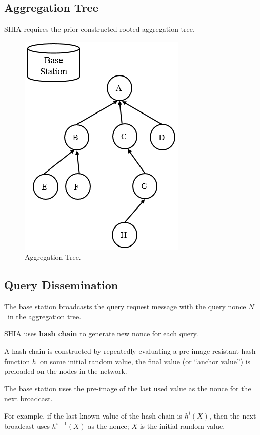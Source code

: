 \documentclass[%
  slidesonly,%
  semlayer%
  ]{seminar}                                  %
\begin{document}
\begin{slide}
    \subsection*{Aggregation Tree}
      SHIA requires the prior constructed rooted aggregation tree.
      \begin{figure}[h!]
        \centering
        \includegraphics[scale=0.4]{images/aggregation-tree-1.png}
        \caption{Aggregation Tree.}
        \label{fig:Aggregation-tree-1}
      \end{figure}
      \clearpage

    \subsection*{Query Dissemination}
      The base station broadcasts the query request message with the query nonce $N$\ in the aggregation tree. 
    
      SHIA uses \textbf{hash chain} to generate new nonce for each query. 
      
      A hash chain is constructed by repeatedly evaluating a pre-image resistant hash function $h$\ on some initial random value, the final value (or ``anchor value'') is preloaded on the nodes in the network.
      
      The base station uses the pre-image of the last used  value as the nonce for the next broadcast.
      
      For example, if the last known value of the hash chain is $h^i(X)$, then the next broadcast uses $h^{i-1}(X)$ as the nonce; $X$ is the initial random value.
      

\end{slide}
\end{document}
